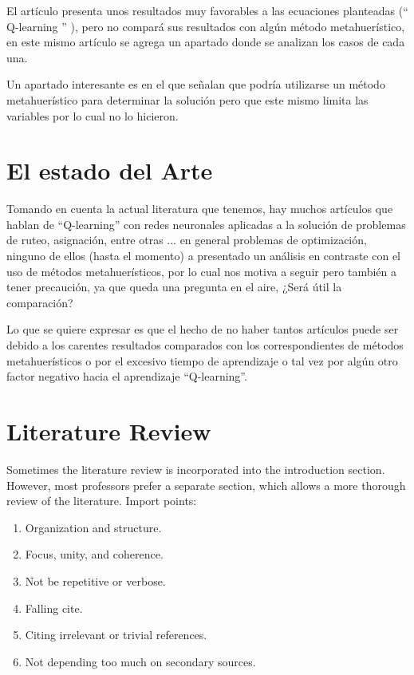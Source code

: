 \documentclass[letterpaper, 10 pt]{article}
\begin{document}
El artículo presenta unos resultados muy favorables a las ecuaciones planteadas (`` Q-learning '' ), pero no compará sus resultados con algún método metahuerístico, en este mismo artículo se agrega un apartado donde se analizan los casos de cada una.

Un apartado interesante es en el que señalan que podría utilizarse un método metahuerístico para determinar la solución pero que este mismo limita las variables por lo cual no lo hicieron.

\section*{El estado del Arte}
Tomando en cuenta la actual literatura que tenemos, hay muchos artículos que hablan de ``Q-learning'' con redes neuronales aplicadas a la solución de problemas de ruteo, asignación, entre otras ... en general problemas de optimización, ninguno de ellos (hasta el momento) a presentado un análisis en contraste con el uso de métodos metahuerísticos, por lo cual nos motiva a seguir pero también a tener precaución, ya que queda una pregunta en el aire, ¿Será útil la comparación?

Lo que se quiere expresar es que el hecho de no haber tantos artículos puede ser debido a los carentes resultados comparados con los correspondientes de métodos metahuerísticos o por el excesivo tiempo de aprendizaje o tal vez por algún otro factor negativo hacia el aprendizaje ``Q-learning''.

\section{Literature  Review}
Sometimes the literature review is incorporated into the introduction section.
However, most professors prefer a separate section, which allows a more thorough
review of the literature.
\newline Import points:
\begin{enumerate}
	\item Organization and structure.
	\item Focus, unity, and coherence.
	\item Not be repetitive or verbose.
	\item Falling cite.
	\item Citing irrelevant or trivial references.
	\item Not depending too much on secondary sources.
\end{enumerate}
\end{document}
